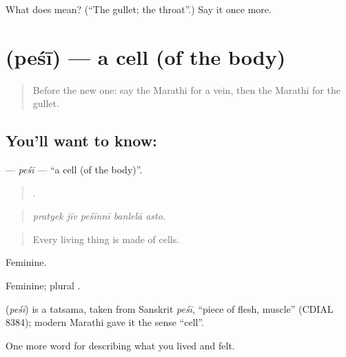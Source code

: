 \begin{tcolorbox}[breakable,colback=teal!4,colframe=teal!35!black,title={Before you move on}]
What does  mean? (\textquotedblleft{}The gullet; the throat\textquotedblright{}.) Say it once more.
\end{tcolorbox}
\section[\texorpdfstring{\mr{पेशी} (peśī)}{पेशी (peśī)}]{ (peśī) — a cell (of the body)}

\label{lesson:MR-C479-pesi}



\begin{quote}
Before the new one: say the Marathi for a vein, then the Marathi for the gullet.
\end{quote}

\subsection*{You'll want to know: }
\textbf{} — \emph{peśī} — \textquotedblleft{}a cell (of the body)\textquotedblright{}.

\begin{quote}
    .
\end{quote}

\begin{quote}
\emph{pratyek jīv peśīnnī banlelā asto.}
\end{quote}

\begin{quote}
Every living thing is made of cells.
\end{quote}

Feminine.

Feminine; plural .

\begin{cousinweb}
\textbf{} (\emph{peśī}) is a tatsama, taken from Sanskrit \emph{peśī}, \textquotedblleft{}piece of flesh, muscle\textquotedblright{} (CDIAL 8384); modern Marathi gave it the sense \textquotedblleft{}cell\textquotedblright{}.
\end{cousinweb}

\begin{grammarlens}[title={What you've built}]
One more word for describing what you lived and felt.
\end{grammarlens}

